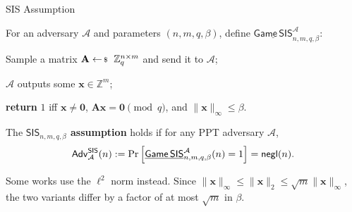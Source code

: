 \documentclass{zkdl-presentation-template}
\begin{document}
    \begin{frame}{SIS Assumption}
        \begin{definition}
            For an adversary $\mathcal{A}$ and parameters $(n,m,q,\beta)$, define $\underline{\mathsf{Game}\,\mathsf{SIS}}^{\mathcal{A}}_{n,m,q,\beta}$:
            \begin{algoen}
                \item Sample a matrix $\mathbf{A} \leftarrowS \mathbb{Z}_q^{n \times m}$ and send it to $\mathcal{A}$;
                \item $\mathcal{A}$ outputs some $\mathbf{x} \in \mathbb{Z}^m$;
                \item \textbf{return} $1$ iff $\mathbf{x} \neq \mathbf{0}$, $\mathbf{A}\mathbf{x} = \mathbf{0} \pmod{q}$, and $\|\mathbf{x}\|_{\infty} \leq \beta$.
            \end{algoen}
            The \textbf{$\mathsf{SIS}_{n,m,q,\beta}$ assumption} holds if for any PPT adversary $\mathcal{A}$,
            \begin{equation*}
                \mathsf{Adv}^{\mathsf{SIS}}_{\mathcal{A}}(n) := \Pr\left[\underline{\mathsf{Game}\,\mathsf{SIS}}^{\mathcal{A}}_{n,m,q,\beta}(n) = 1\right] = \mathsf{negl}(n).
            \end{equation*}
        \end{definition}
        \pause

        \begin{remark}
            Some works use the $\ell^2$ norm instead. Since $\|\mathbf{x}\|_{\infty} \leq \|\mathbf{x}\|_2 \leq \sqrt{m}\|\mathbf{x}\|_{\infty}$, the two variants differ by a factor of at most $\sqrt{m}$ in $\beta$.
        \end{remark}
    \end{frame}
\end{document}
